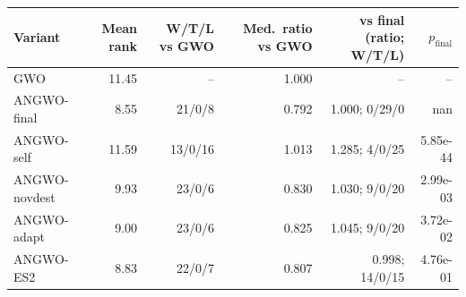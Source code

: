 \begin{tabular}{lrrrrr}
\toprule
Variant & Mean rank & W/T/L vs GWO & Med.\ ratio vs GWO & vs final (ratio; W/T/L) & $p_{\mathrm{final}}$\\
\midrule
GWO & 11.45 & -- & 1.000 & -- & -- \\
ANGWO-final & 8.55 & 21/0/8 & 0.792 & 1.000; 0/29/0 & nan \\
ANGWO-self & 11.59 & 13/0/16 & 1.013 & 1.285; 4/0/25 & 5.85e-44 \\
ANGWO-novdest & 9.93 & 23/0/6 & 0.830 & 1.030; 9/0/20 & 2.99e-03 \\
ANGWO-adapt & 9.00 & 23/0/6 & 0.825 & 1.045; 9/0/20 & 3.72e-02 \\
ANGWO-ES2 & 8.83 & 22/0/7 & 0.807 & 0.998; 14/0/15 & 4.76e-01 \\
\bottomrule
\end{tabular}